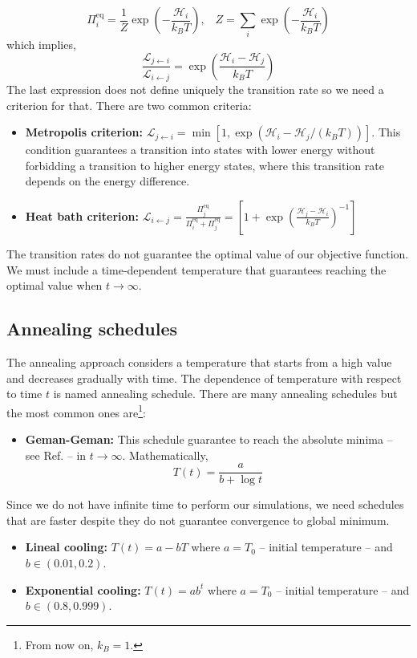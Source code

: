 \begin{equation}
    \Pi_{i}^{\mathrm{eq}} = \frac{1}{Z}\exp\left(- \frac{\mathcal{H}_{i}}{k_{B}T}\right), \;\;\; Z = \sum_{i}\exp\left(-\frac{\mathcal{H}_{i}}{k_{B}T}\right)
\end{equation}
which implies,
\begin{equation}
    \frac{\mathcal{L}_{j \leftarrow i}}{\mathcal{L}_{i \leftarrow j}} = \exp\left(\frac{\mathcal{H}_{i} - \mathcal{H}_{j}}{k_{B}T}\right)
\end{equation}
The last expression does not define uniquely the transition rate so we need a criterion for that. There are two common criteria:
\begin{itemize}
    \item\textbf{Metropolis criterion:} $\mathcal{L}_{j \leftarrow i} = \min \left[1,\exp\left(\mathcal{H}_{i}-\mathcal{H}_{j}/\left(k_{B}T\right)\right)\right]$. This condition guarantees a transition into states with lower energy without forbidding a transition to higher energy states, where this transition rate depends on the energy difference. 
    \item \textbf{Heat bath criterion:} $\mathcal{L}_{i \leftarrow j} = \frac{\Pi_{j}^{\mathrm{eq}}}{\Pi_{i}^{\mathrm{eq}} + \Pi_{j}^{\mathrm{eq}}} = \left[1 + \exp\left(\frac{\mathcal{H}_{j}- \mathcal{H}_{i}}{k_{B}T}\right)^{-1}\right]$ 
\end{itemize}
 The transition rates do not guarantee the optimal value of our objective function. We must include a time-dependent temperature that guarantees reaching the optimal value when $t \rightarrow \infty$. 
\subsection{Annealing schedules}
The annealing approach considers a temperature that starts from a high value and decreases gradually with time. The dependence of temperature with respect to time $t$ is named annealing schedule. There are many annealing schedules but the most common ones are\footnote{From now on, $k_{B} = 1$.}:
\begin{itemize}
    \item \textbf{Geman-Geman:} This schedule guarantee to reach the absolute minima -- see Ref. \cite{Geman1984StochasticImages} -- in $t \rightarrow \infty$. Mathematically,
    \begin{equation}
        T(t) = \frac{a}{b + \log{t}}
    \end{equation}
\end{itemize}
Since we do not have infinite time to perform our simulations, we need schedules that are faster despite they do not guarantee convergence to global minimum. 
\begin{itemize}
    \item \textbf{Lineal cooling:} $T(t) = a - bT$ where $a = T_{0}$ -- initial temperature -- and $b \in (0.01,0.2)$.
    \item \textbf{Exponential cooling:} $T(t) = ab^{t}$ where $a = T_{0}$ -- initial temperature -- and $b \in (0.8,0.999)$.
\end{itemize}

